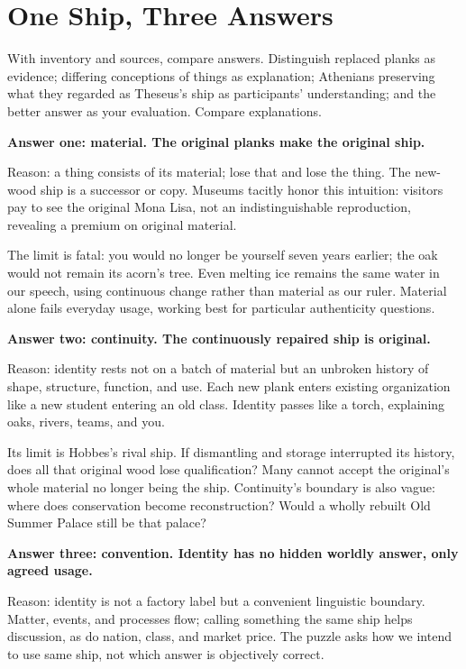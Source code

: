 \section{One Ship, Three Answers}
With inventory and sources, compare answers. Distinguish replaced planks as evidence; differing conceptions of things as explanation; Athenians preserving what they regarded as Theseus's ship as participants' understanding; and the better answer as your evaluation. Compare explanations.

\textbf{Answer one: material. The original planks make the original ship.}

Reason: a thing consists of its material; lose that and lose the thing. The new-wood ship is a successor or copy. Museums tacitly honor this intuition: visitors pay to see the original Mona Lisa, not an indistinguishable reproduction, revealing a premium on original material.

The limit is fatal: you would no longer be yourself seven years earlier; the oak would not remain its acorn's tree. Even melting ice remains the same water in our speech, using continuous change rather than material as our ruler. Material alone fails everyday usage, working best for particular authenticity questions.

\textbf{Answer two: continuity. The continuously repaired ship is original.}

Reason: identity rests not on a batch of material but an unbroken history of shape, structure, function, and use. Each new plank enters existing organization like a new student entering an old class. Identity passes like a torch, explaining oaks, rivers, teams, and you.

Its limit is Hobbes's rival ship. If dismantling and storage interrupted its history, does all that original wood lose qualification? Many cannot accept the original's whole material no longer being the ship. Continuity's boundary is also vague: where does conservation become reconstruction? Would a wholly rebuilt Old Summer Palace still be that palace?

\textbf{Answer three: convention. Identity has no hidden worldly answer, only agreed usage.}

Reason: identity is not a factory label but a convenient linguistic boundary. Matter, events, and processes flow; calling something the same ship helps discussion, as do nation, class, and market price. The puzzle asks how we intend to use same ship, not which answer is objectively correct.

